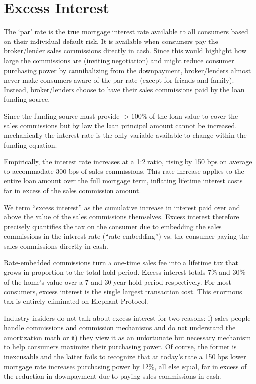 \appendix

\chapter{Excess Interest}

The `par' rate is the true mortgage interest rate available to all consumers based on their individual default risk. It is available when consumers pay the broker/lender sales commissions directly in cash. Since this would highlight how large the commissions are (inviting negotiation) and might reduce consumer purchasing power by cannibalizing from the downpayment, broker/lenders almost never make consumers aware of the par rate (except for friends and family). Instead, broker/lenders choose to have their sales commissions paid by the loan funding source.

Since the funding source must provide \(>100\%\) of the loan value to cover the sales commissions but by law the loan principal amount cannot be increased, mechanically the interest rate is the only variable available to change within the funding equation.

Empirically, the interest rate increases at a 1:2 ratio, rising by 150 bps on average to accommodate 300 bps of sales commissions. This rate increase applies to the entire loan amount over the full mortgage term, inflating lifetime interest costs far in excess of the sales commission amount.

We term ``excess interest'' as the cumulative increase in interest paid over and above the value of the sales commissions themselves. Excess interest therefore precisely quantifies the tax on the consumer due to embedding the sales commissions in the interest rate (``rate-embedding'') vs. the consumer paying the sales commissions directly in cash.

Rate-embedded commissions turn a one-time sales fee into a lifetime tax that grows in proportion to the total hold period. Excess interest totals 7\% and 30\% of the home's value over a 7 and 30 year hold period respectively. For most consumers, excess interest is the single largest transaction cost. This enormous tax is entirely eliminated on Elephant Protocol.

Industry insiders do not talk about excess interest for two reasons: i) sales people handle commissions and commission mechanisms and do not understand the amortization math or ii) they view it as an unfortunate but necessary mechanism to help consumers maximize their purchasing power. Of course, the former is inexcusable and the latter fails to recognize that at today's rate a 150 bps lower mortgage rate increases purchasing power by 12\%, all else equal, far in excess of the reduction in downpayment due to paying sales commissions in cash.